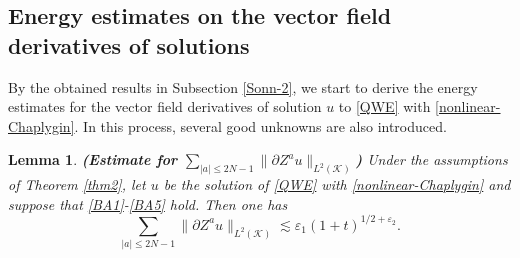 \documentclass[11pt,twoside]{article}
\def\cK{\mathcal K}
\def\ds{\displaystyle}
\def\p{\partial}
\def\ve{\varepsilon}
\def\ls{\lesssim}
\theoremstyle{plain}
\newtheorem{lemma}[theorem]{Lemma}
\theoremstyle{definition}
\numberwithin{equation}{section}
\begin{document}
\subsection{Energy estimates on the  vector field  derivatives of solutions}\label{Sonn-3}
By the obtained results in Subsection \ref{Sonn-2}, we start to derive the energy estimates
for the vector field derivatives of solution $u$ to \eqref{QWE} with \eqref{nonlinear-Chaplygin}.
In this process, several good unknowns are also introduced.
\begin{lemma}
{\bf (Estimate for $\ds\sum_{|a|\le2N-1}\|\p Z^au\|_{L^2(\cK)}$)}
Under the assumptions of Theorem \ref{thm2}, let $u$ be the solution of \eqref{QWE}  with \eqref{nonlinear-Chaplygin}
and suppose that \eqref{BA1}-\eqref{BA5} hold.
Then one has
\begin{equation}\label{energyA}
\sum_{|a|\le2N-1}\|\p Z^au\|_{L^2(\cK)}\ls\ve_1(1+t)^{1/2+\ve_2}.
\end{equation}
\end{lemma}
\end{document}
